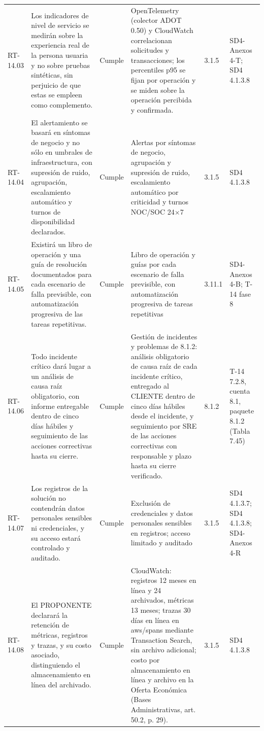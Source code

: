 \documentclass[carta,firma,final]{lafrox}
\begin{document}
\begin{landscape}
{\begin{longtable}{@{}F{0.070} F{0.255} F{0.075} F{0.280} F{0.090} F{0.230}@{}}
  RT-14.03 & Los indicadores de nivel de servicio se medirán sobre la experiencia real de la persona usuaria y no sobre pruebas sintéticas, sin perjuicio de que estas se empleen como complemento. & Cumple & OpenTelemetry (colector ADOT 0.50) y CloudWatch correlacionan solicitudes y transacciones; los percentiles p95 se fijan por operación y se miden sobre la operación percibida y confirmada. & 3.1.5 & SD4-Anexos 4-T; SD4 4.1.3.8 \\
  RT-14.04 & El alertamiento se basará en síntomas de negocio y no sólo en umbrales de infraestructura, con supresión de ruido, agrupación, escalamiento automático y turnos de disponibilidad declarados. & Cumple & Alertas por síntomas de negocio, agrupación y supresión de ruido, escalamiento automático por criticidad y turnos NOC/SOC 24$\times$7 & 3.1.5 & SD4 4.1.3.8 \\
  RT-14.05 & Existirá un libro de operación y una guía de resolución documentados para cada escenario de falla previsible, con automatización progresiva de las tareas repetitivas. & Cumple & Libro de operación y guías por cada escenario de falla previsible, con automatización progresiva de tareas repetitivas & 3.11.1 & SD4-Anexos 4-B; T-14 fase 8 \\
  RT-14.06 & Todo incidente crítico dará lugar a un análisis de causa raíz obligatorio, con informe entregable dentro de cinco días hábiles y seguimiento de las acciones correctivas hasta su cierre. & Cumple & Gestión de incidentes y problemas de 8.1.2: análisis obligatorio de causa raíz de cada incidente crítico, entregado al CLIENTE dentro de cinco días hábiles desde el incidente, y seguimiento por SRE de las acciones correctivas con responsable y plazo hasta su cierre verificado. & 8.1.2 & T-14 7.2.8, cuenta 8.1, paquete 8.1.2 (Tabla 7.45) \\
  RT-14.07 & Los registros de la solución no contendrán datos personales sensibles ni credenciales, y su acceso estará controlado y auditado. & Cumple & Exclusión de credenciales y datos personales sensibles en registros; acceso limitado y auditado & 3.1.5 & SD4 4.1.3.7; SD4 4.1.3.8; SD4-Anexos 4-R \\
  RT-14.08 & El PROPONENTE declarará la retención de métricas, registros y trazas, y su costo asociado, distinguiendo el almacenamiento en línea del archivado. & Cumple & CloudWatch: registros 12 meses en línea y 24 archivados, métricas 13 meses; trazas 30 días en línea en aws/spans mediante Transaction Search, sin archivo adicional; costo por almacenamiento en línea y archivo en la Oferta Económica (Bases Administrativas, art. 50.2, p. 29). & 3.1.5 & SD4 4.1.3.8 \\

\end{longtable}}
\end{landscape}
\end{document}
